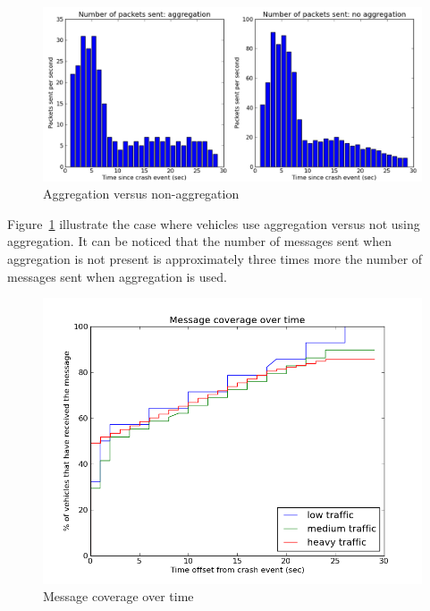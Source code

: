 \documentclass{IEEEtran}
\begin{document}
\noindent
\begin{figure}[h]
\centering
\includegraphics[scale=0.32]{Figure_02.png}
\caption{Aggregation versus non-aggregation}
\label{fig_aggregation_nonaggregation}
\end{figure}

Figure~\ref{fig_aggregation_nonaggregation} illustrate the case where vehicles use aggregation versus not using aggregation. It can be noticed that the number of messages sent when aggregation is not present is approximately three times more the number of messages sent when aggregation is used.

\noindent
\begin{figure}[h]
\centering
\includegraphics[scale=0.45]{Figure_03.png}
\caption{Message coverage over time}
\label{fig_msg_coverage}
\end{figure}
\end{document}
